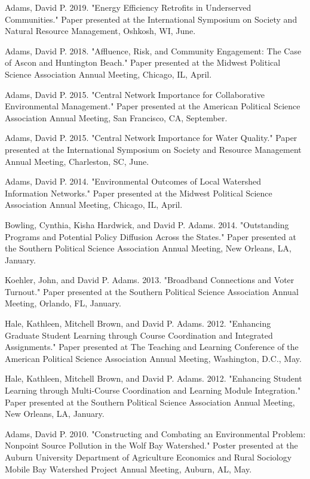 \documentclass[12pt,letterpaper]{article}
\renewenvironment{itemize}{
  \begin{list}{}{
    \setlength{\leftmargin}{1.5em}
    \setlength{\itemsep}{0.25em}
    \setlength{\parskip}{0pt}
    \setlength{\parsep}{0.25em}
  }
}{
  \end{list}
}
\begin{document}
\begin{itemize}
      \item Adams, David P. 2019. "Energy Efficiency Retrofits in Underserved Communities." Paper presented at the International Symposium on Society and Natural Resource Management, Oshkosh, WI, June.
      
      \item Adams, David P. 2018. "Affluence, Risk, and Community Engagement: The Case of Ascon and Huntington Beach." Paper presented at the Midwest Political Science Association Annual Meeting, Chicago, IL, April.
      
      \item Adams, David P. 2015. "Central Network Importance for Collaborative Environmental Management." Paper presented at the American Political Science Association Annual Meeting, San Francisco, CA, September.
      
      \item Adams, David P. 2015. "Central Network Importance for Water Quality." Paper presented at the International Symposium on Society and Resource Management Annual Meeting, Charleston, SC, June.
      
      \item Adams, David P. 2014. "Environmental Outcomes of Local Watershed Information Networks." Paper presented at the Midwest Political Science Association Annual Meeting, Chicago, IL, April.
      
      \item Bowling, Cynthia, Kisha Hardwick, and David P. Adams. 2014. "Outstanding Programs and Potential Policy Diffusion Across the States." Paper presented at the Southern Political Science Association Annual Meeting, New Orleans, LA, January.
      
      \item Koehler, John, and David P. Adams. 2013. "Broadband Connections and Voter Turnout." Paper presented at the Southern Political Science Association Annual Meeting, Orlando, FL, January.
      
      \item Hale, Kathleen, Mitchell Brown, and David P. Adams. 2012. "Enhancing Graduate Student Learning through Course Coordination and Integrated Assignments." Paper presented at The Teaching and Learning Conference of the American Political Science Association Annual Meeting, Washington, D.C., May.
      
      \item Hale, Kathleen, Mitchell Brown, and David P. Adams. 2012. "Enhancing Student Learning through Multi-Course Coordination and Learning Module Integration." Paper presented at the Southern Political Science Association Annual Meeting, New Orleans, LA, January.
      
      \item Adams, David P. 2010. "Constructing and Combating an Environmental Problem: Nonpoint Source Pollution in the Wolf Bay Watershed." Poster presented at the Auburn University Department of Agriculture Economics and Rural Sociology Mobile Bay Watershed Project Annual Meeting, Auburn, AL, May.
  \end{itemize}
  
\end{document}
